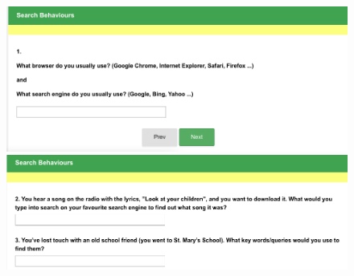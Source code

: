 \documentclass[a4paper, 11pt]{article}
\begin{document}
\begin{figure}[H]
\begin{center}
\includegraphics[scale=0.5]{survey3}\\
\includegraphics[scale=0.5]{survey4}\\
\end{center}
\end{figure}
\newpage
\end{document}
